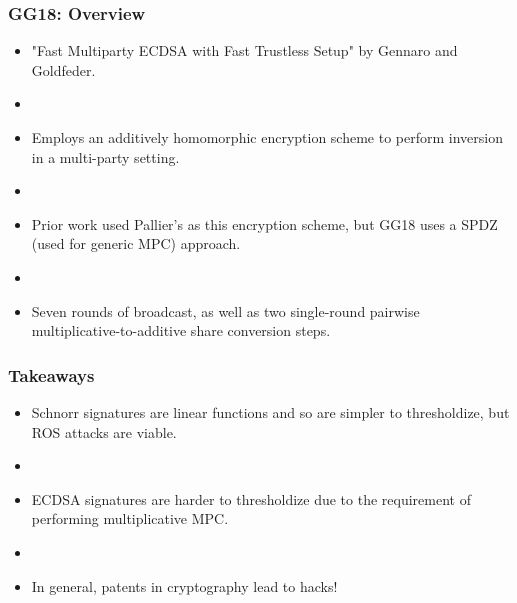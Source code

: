 \documentclass[hyperref={pdfpagelabels=true},table,dvipsnames,14pt,aspectratio=169]{beamer}
\begin{document}
\begin{frame}
  \frametitle{GG18: Overview}

  \begin{itemize}
    \item<1-> "Fast Multiparty ECDSA with Fast Trustless Setup" by Gennaro and Goldfeder. 
    \item[]
    \item<2-> Employs an additively homomorphic encryption scheme to perform inversion in a multi-party setting. 
    \item[]
    \item<3-> Prior work used Pallier's as this encryption scheme, but GG18 uses a SPDZ (used for generic MPC) approach. 
    \item[]
    \item<4-> Seven rounds of broadcast, as well as two single-round pairwise multiplicative-to-additive share conversion steps. 
  \end{itemize}
\end{frame}










\begin{frame}
  \frametitle{Takeaways}

  \begin{itemize}
    \item Schnorr signatures are linear functions and so are simpler to thresholdize, but ROS attacks are viable.  
    \item[]
    \item ECDSA signatures are harder to thresholdize due to the requirement of performing multiplicative MPC. 
    \item[]
    \item In general, patents in cryptography lead to hacks!
  \end{itemize}
\end{frame}
\end{document}
